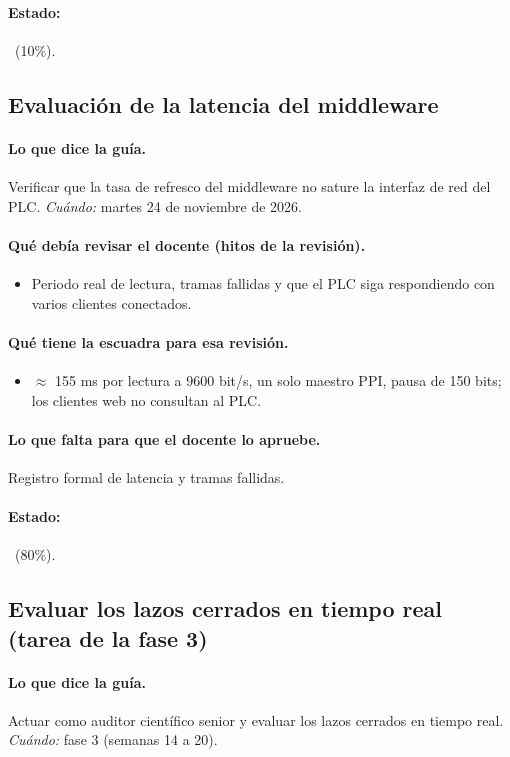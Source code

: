 \documentclass[a4paper,11pt]{article}
\begin{document}
\paragraph{Estado:} \parcial~(10\%).
\subsection{Evaluación de la latencia del middleware}
\paragraph{Lo que dice la guía.} Verificar que la tasa de refresco del middleware no sature la interfaz de red del PLC. \textit{Cuándo:} martes 24 de noviembre de 2026.
\paragraph{Qué debía revisar el docente (hitos de la revisión).}
\begin{itemize}
\item[$\square$] Periodo real de lectura, tramas fallidas y que el PLC siga respondiendo con varios clientes conectados.
\end{itemize}
\paragraph{Qué tiene la escuadra para esa revisión.}
\begin{itemize}
\item $\approx$ 155 ms por lectura a 9600 bit/s, un solo maestro PPI, pausa de 150 bits; los clientes web no consultan al PLC.
\end{itemize}
\paragraph{Lo que falta para que el docente lo apruebe.} Registro formal de latencia y tramas fallidas.
\paragraph{Estado:} \parcial~(80\%).
\subsection{Evaluar los lazos cerrados en tiempo real (tarea de la fase 3)}
\paragraph{Lo que dice la guía.} Actuar como auditor científico senior y evaluar los lazos cerrados en tiempo real. \textit{Cuándo:} fase 3 (semanas 14 a 20).
\end{document}
